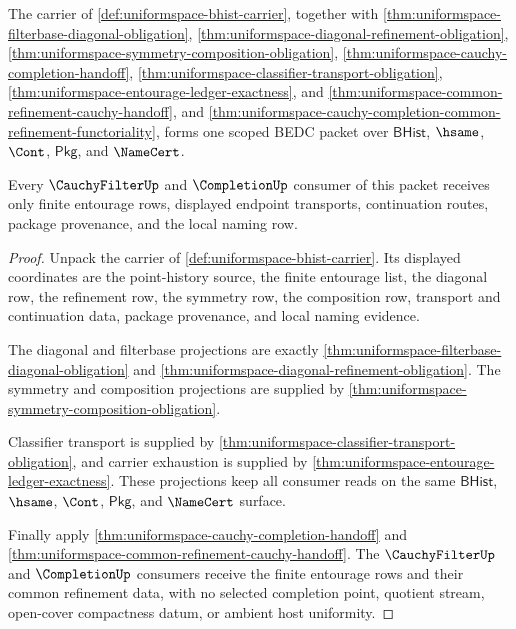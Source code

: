 \begin{theorem}
\label{thm:uniformspace-scoped-entourage-package}
The carrier of \autoref{def:uniformspace-bhist-carrier}, together with
\autoref{thm:uniformspace-filterbase-diagonal-obligation},
\autoref{thm:uniformspace-diagonal-refinement-obligation},
\autoref{thm:uniformspace-symmetry-composition-obligation},
\autoref{thm:uniformspace-cauchy-completion-handoff},
\autoref{thm:uniformspace-classifier-transport-obligation},
\autoref{thm:uniformspace-entourage-ledger-exactness}, and
\autoref{thm:uniformspace-common-refinement-cauchy-handoff}, and
\autoref{thm:uniformspace-cauchy-completion-common-refinement-functoriality},
forms one scoped BEDC packet over $\mathsf{BHist}$, $\hsame$, $\Cont$,
$\mathsf{Pkg}$, and $\NameCert$.

Every $\CauchyFilterUp$ and $\CompletionUp$ consumer of this packet receives
only finite entourage rows, displayed endpoint transports, continuation
routes, package provenance, and the local naming row.
\end{theorem}
\begin{proof}
Unpack the carrier of \autoref{def:uniformspace-bhist-carrier}. Its displayed
coordinates are the point-history source, the finite entourage list, the
diagonal row, the refinement row, the symmetry row, the composition row,
transport and continuation data, package provenance, and local naming evidence.

The diagonal and filterbase projections are exactly
\autoref{thm:uniformspace-filterbase-diagonal-obligation} and
\autoref{thm:uniformspace-diagonal-refinement-obligation}. The symmetry and
composition projections are supplied by
\autoref{thm:uniformspace-symmetry-composition-obligation}.

Classifier transport is supplied by
\autoref{thm:uniformspace-classifier-transport-obligation}, and carrier
exhaustion is supplied by
\autoref{thm:uniformspace-entourage-ledger-exactness}. These projections keep
all consumer reads on the same $\mathsf{BHist}$, $\hsame$, $\Cont$,
$\mathsf{Pkg}$, and $\NameCert$ surface.

Finally apply \autoref{thm:uniformspace-cauchy-completion-handoff} and
\autoref{thm:uniformspace-common-refinement-cauchy-handoff}. The
$\CauchyFilterUp$ and $\CompletionUp$ consumers receive the finite entourage
rows and their common refinement data, with no selected completion point,
quotient stream, open-cover compactness datum, or ambient host uniformity.
\end{proof}

